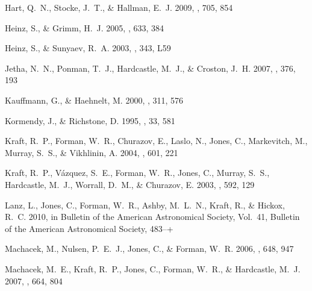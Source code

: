 \documentclass[12pt, preprint]{aastex}
\begin{document}
\begin{thebibliography}{68}
{Hart}, Q.~N., {Stocke}, J.~T., \& {Hallman}, E.~J. 2009, \apj, 705, 854

{Heinz}, S., \& {Grimm}, H.~J. 2005, \apj, 633, 384

{Heinz}, S., \& {Sunyaev}, R.~A. 2003, \mnras, 343, L59

{Jetha}, N.~N., {Ponman}, T.~J., {Hardcastle}, M.~J., \& {Croston}, J.~H. 2007,
  \mnras, 376, 193

{Kauffmann}, G., \& {Haehnelt}, M. 2000, \mnras, 311, 576

{Kormendy}, J., \& {Richstone}, D. 1995, \araa, 33, 581

{Kraft}, R.~P., {Forman}, W.~R., {Churazov}, E., {Laslo}, N., {Jones}, C.,
  {Markevitch}, M., {Murray}, S.~S., \& {Vikhlinin}, A. 2004, \apj, 601, 221

{Kraft}, R.~P., {V{\'a}zquez}, S.~E., {Forman}, W.~R., {Jones}, C., {Murray},
  S.~S., {Hardcastle}, M.~J., {Worrall}, D.~M., \& {Churazov}, E. 2003, \apj,
  592, 129

{Lanz}, L., {Jones}, C., {Forman}, W.~R., {Ashby}, M.~L.~N., {Kraft}, R., \&
  {Hickox}, R.~C. 2010, in Bulletin of the American Astronomical Society,
  Vol.~41, Bulletin of the American Astronomical Society, 483--+

{Machacek}, M., {Nulsen}, P.~E.~J., {Jones}, C., \& {Forman}, W.~R. 2006, \apj,
  648, 947

{Machacek}, M.~E., {Kraft}, R.~P., {Jones}, C., {Forman}, W.~R., \&
  {Hardcastle}, M.~J. 2007, \apj, 664, 804


\end{thebibliography}
\end{document}

